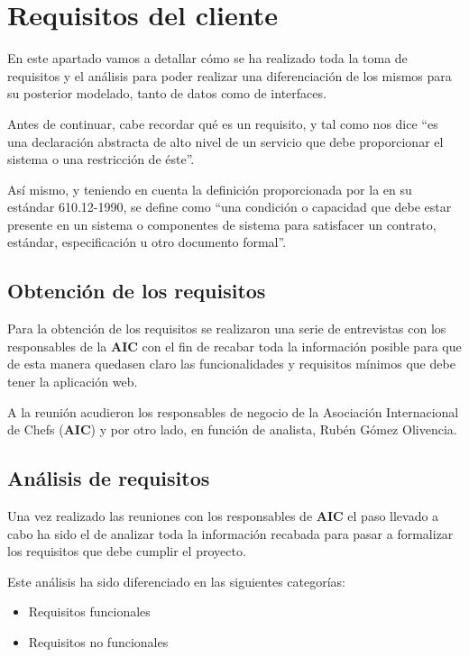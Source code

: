 \documentclass{\ClassPath/viu-tfm-template}
\begin{document}
\chapter{Requisitos del cliente}

En este apartado vamos a detallar cómo se ha realizado toda la toma de requisitos y el análisis para poder realizar una diferenciación de los mismos para su posterior modelado, tanto de datos como de interfaces.

Antes de continuar, cabe recordar qué es un requisito, y tal como nos dice \textcite{Sommerville2005} “es una declaración abstracta de alto nivel de un servicio que debe proporcionar el sistema o una restricción de éste”.

Así mismo, y teniendo en cuenta la definición proporcionada por la \textcite{IEEE610} en su estándar 610.12-1990, se define como “una condición o capacidad que debe estar presente en un sistema o componentes de sistema para satisfacer un contrato, estándar, especificación u otro documento formal”.


\section{Obtención de los requisitos}
Para la obtención de los requisitos se realizaron una serie de entrevistas con los responsables de la \textbf{AIC} con el fin de recabar toda la información posible para que de esta manera quedasen claro las funcionalidades y requisitos mínimos que debe tener la aplicación web.

A la reunión acudieron los responsables de negocio de la Asociación Internacional de Chefs (\textbf{AIC}) y por otro lado, en función de analista, Rubén Gómez Olivencia.




\section{Análisis de requisitos}
Una vez realizado las reuniones con los responsables de \textbf{AIC} el paso llevado a cabo ha sido el de analizar toda la información recabada para pasar a formalizar los requisitos que debe cumplir el proyecto.

Este análisis ha sido diferenciado en las siguientes categorías:

\begin{itemize}
    \item Requisitos funcionales
    \item Requisitos no funcionales
\end{itemize}
\end{document}
